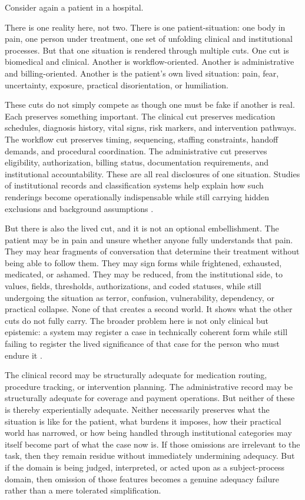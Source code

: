 \documentclass[11pt]{article}
\begin{document}
Consider again a patient in a hospital.

There is one reality here, not two. There is one patient-situation: one body in pain, one person under treatment, one set of unfolding clinical and institutional processes. But that one situation is rendered through multiple cuts. One cut is biomedical and clinical. Another is workflow-oriented. Another is administrative and billing-oriented. Another is the patient's own lived situation: pain, fear, uncertainty, exposure, practical disorientation, or humiliation.

These cuts do not simply compete as though one must be fake if another is real. Each preserves something important. The clinical cut preserves medication schedules, diagnosis history, vital signs, risk markers, and intervention pathways. The workflow cut preserves timing, sequencing, staffing constraints, handoff demands, and procedural coordination. The administrative cut preserves eligibility, authorization, billing status, documentation requirements, and institutional accountability. These are all real disclosures of one situation. Studies of institutional records and classification systems help explain how such renderings become operationally indispensable while still carrying hidden exclusions and background assumptions \cite{BowkerStar1999}.

But there is also the lived cut, and it is not an optional embellishment. The patient may be in pain and unsure whether anyone fully understands that pain. They may hear fragments of conversation that determine their treatment without being able to follow them. They may sign forms while frightened, exhausted, medicated, or ashamed. They may be reduced, from the institutional side, to values, fields, thresholds, authorizations, and coded statuses, while still undergoing the situation as terror, confusion, vulnerability, dependency, or practical collapse. None of that creates a second world. It shows what the other cuts do not fully carry. The broader problem here is not only clinical but epistemic: a system may register a case in technically coherent form while still failing to register the lived significance of that case for the person who must endure it \cite{Fricker2007}.

The clinical record may be structurally adequate for medication routing, procedure tracking, or intervention planning. The administrative record may be structurally adequate for coverage and payment operations. But neither of these is thereby experientially adequate. Neither necessarily preserves what the situation is like for the patient, what burdens it imposes, how their practical world has narrowed, or how being handled through institutional categories may itself become part of what the case now is. If those omissions are irrelevant to the task, then they remain residue without immediately undermining adequacy. But if the domain is being judged, interpreted, or acted upon as a subject-process domain, then omission of those features becomes a genuine adequacy failure rather than a mere tolerated simplification.
\end{document}
